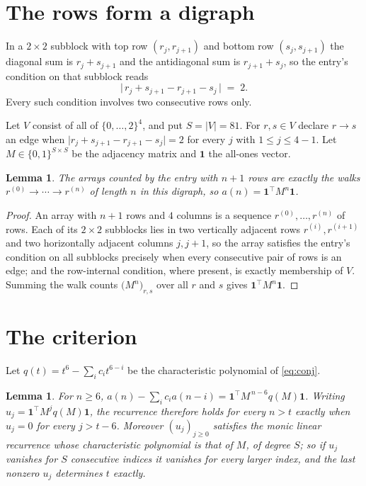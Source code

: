 \documentclass[11pt,a4paper]{article}
\theoremstyle{plain}
\newtheorem{lemma}[theorem]{Lemma}
\theoremstyle{definition}
\begin{document}
\section{The rows form a digraph}

In a $2\times2$ subblock with top row $(r_j,r_{j+1})$ and bottom row $(s_j,s_{j+1})$ the
diagonal sum is $r_j+s_{j+1}$ and the antidiagonal sum is $r_{j+1}+s_j$, so the entry's
condition on that subblock reads
\[
\bigl|\,r_j+s_{j+1}-r_{j+1}-s_j\,\bigr|\;=\;2.
\]
Every such condition involves two consecutive rows only.

Let $V$ consist of all of $\{0,\dots,2\}^{4}$, and put $S=|V|=81$. For $r,s\in V$ declare $r\to s$ an edge
when $\bigl|r_j+s_{j+1}-r_{j+1}-s_j\bigr|=2$ for every $j$ with
$1\le j\le4-1$. Let $M\in\{0,1\}^{S\times S}$ be the adjacency matrix and $\mathbf{1}$
the all-ones vector.

\begin{lemma}\label{lem:walk}
The arrays counted by the entry with $n+1$ rows are exactly the walks
$r^{(0)}\to\cdots\to r^{(n)}$ of length $n$ in this digraph, so
$a(n)=\mathbf{1}^{\!\top}M^{n}\mathbf{1}$.
\end{lemma}

\begin{proof}
An array with $n+1$ rows and $4$ columns is a sequence $r^{(0)},\dots,r^{(n)}$ of
rows. Each of its $2\times2$ subblocks lies in two vertically adjacent rows
$r^{(i)},r^{(i+1)}$ and two horizontally adjacent columns $j,j+1$, so the array satisfies
the entry's condition on all subblocks precisely when every consecutive pair of rows is an
edge; and the row-internal condition, where present, is exactly membership of $V$. Summing
the walk counts $\bigl(M^{n}\bigr)_{r,s}$ over all $r$ and $s$ gives
$\mathbf{1}^{\!\top}M^{n}\mathbf{1}$.
\end{proof}

\section{The criterion}

Let $q(t)=t^{6}-\sum_i c_i t^{6-i}$ be the characteristic polynomial of
\eqref{eq:conj}.

\begin{lemma}\label{lem:crit}
For $n\ge6$,
$a(n)-\sum_i c_i a(n-i)=\mathbf{1}^{\!\top}M^{\,n-6}q(M)\mathbf{1}$. Writing
$u_j=\mathbf{1}^{\!\top}M^{j}q(M)\mathbf{1}$, the recurrence therefore holds for every
$n>t$ exactly when $u_j=0$ for every $j>t-6$. Moreover $(u_j)_{j\ge0}$ satisfies the
monic linear recurrence whose characteristic polynomial is that of $M$, of degree $S$; so
if $u_j$ vanishes for $S$ consecutive indices it vanishes for every larger index, and the
last nonzero $u_j$ determines $t$ exactly.
\end{lemma}
\end{document}

